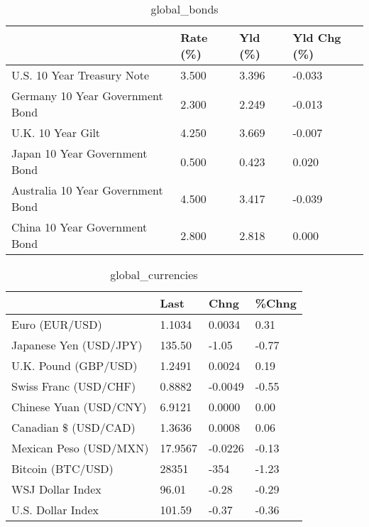 \documentclass{article}%
\begin{document}
%


\begin{table}[htbp]%
\caption{global\_bonds}%
\centering%
\begin{adjustbox}{width=1\textwidth}%
\begin{tabular}{llll}
\toprule
                                  & Rate (\%) & Yld (\%) & Yld Chg (\%) \\
\midrule
       U.S. 10 Year Treasury Note &    3.500 &   3.396 &      -0.033 \\
  Germany 10 Year Government Bond &    2.300 &   2.249 &      -0.013 \\
                U.K. 10 Year Gilt &    4.250 &   3.669 &      -0.007 \\
    Japan 10 Year Government Bond &    0.500 &   0.423 &       0.020 \\
Australia 10 Year Government Bond &    4.500 &   3.417 &      -0.039 \\
    China 10 Year Government Bond &    2.800 &   2.818 &       0.000 \\
\bottomrule
\end{tabular}
%
\end{adjustbox}%
\end{table}

%


\begin{table}[htbp]%
\caption{global\_currencies}%
\centering%
\begin{adjustbox}{width=1\textwidth}%
\begin{tabular}{llll}
\toprule
                       &    Last &    Chng & \%Chng \\
\midrule
        Euro (EUR/USD) &  1.1034 &  0.0034 &  0.31 \\
Japanese Yen (USD/JPY) &  135.50 &   -1.05 & -0.77 \\
  U.K. Pound (GBP/USD) &  1.2491 &  0.0024 &  0.19 \\
 Swiss Franc (USD/CHF) &  0.8882 & -0.0049 & -0.55 \\
Chinese Yuan (USD/CNY) &  6.9121 &  0.0000 &  0.00 \\
  Canadian \$ (USD/CAD) &  1.3636 &  0.0008 &  0.06 \\
Mexican Peso (USD/MXN) & 17.9567 & -0.0226 & -0.13 \\
     Bitcoin (BTC/USD) &   28351 &    -354 & -1.23 \\
      WSJ Dollar Index &   96.01 &   -0.28 & -0.29 \\
     U.S. Dollar Index &  101.59 &   -0.37 & -0.36 \\
\bottomrule
\end{tabular}
%
\end{adjustbox}%
\end{table}
\end{document}
